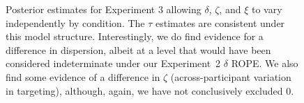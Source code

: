 \documentclass[doc,biblatex]{apa7}
\begin{document}
\begin{figure}
\vspace*{2pt}
\caption{Posterior estimates for Experiment 3 allowing $\delta$, $\zeta$, and $\xi$ to vary independently by condition. The $\tau$ estimates are consistent under this model structure. Interestingly, we do find evidence for a difference in dispersion, albeit at a level that would have been considered indeterminate under our Experiment~2 $\delta$ ROPE. We also find some evidence of a difference in $\zeta$ (across-participant variation in targeting), although, again, we have not conclusively excluded 0.}
\label{supp6}
\end{figure}
\end{document}
